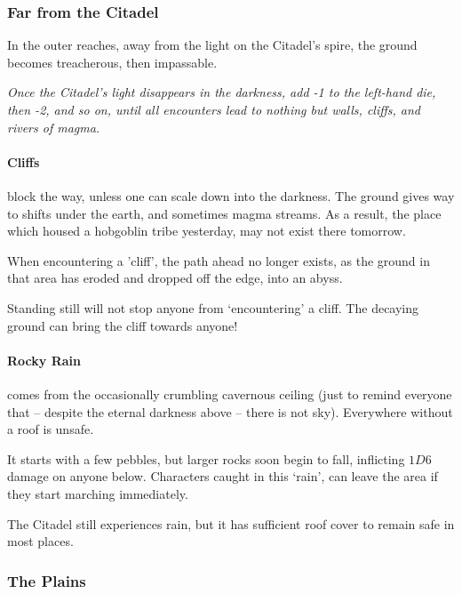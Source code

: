 \begin{multicols}{2}
\subsubsection{Far from the Citadel}

In the outer reaches, away from the light on the Citadel's spire, the ground becomes treacherous, then impassable.

\textit{Once the Citadel's light disappears in the darkness, add -1 to the left-hand die, then -2, and so on, until all encounters lead to nothing but walls, cliffs, and rivers of magma.}

\paragraph{Cliffs}
block the way, unless one can scale down into the darkness.
The ground gives way to shifts under the earth, and sometimes magma streams.
As a result, the place which housed a hobgoblin tribe yesterday, may not exist there tomorrow.

When encountering a 'cliff', the path ahead no longer exists, as the ground in that area has eroded and dropped off the edge, into an abyss.

Standing still will not stop anyone from `encountering' a cliff.
The decaying ground can bring the cliff towards anyone!



\paragraph{Rocky Rain}
comes from the occasionally crumbling cavernous ceiling (just to remind everyone that -- despite the eternal darkness above -- there is not sky).
Everywhere without a roof is unsafe.

It starts with a few pebbles, but larger rocks soon begin to fall, inflicting $1D6$ damage on anyone below.
Characters caught in this `rain', can leave the area if they start marching immediately.

The Citadel still experiences rain, but it has sufficient roof cover to remain safe in most places.

\subsubsection{The Plains}


\end{multicols}
